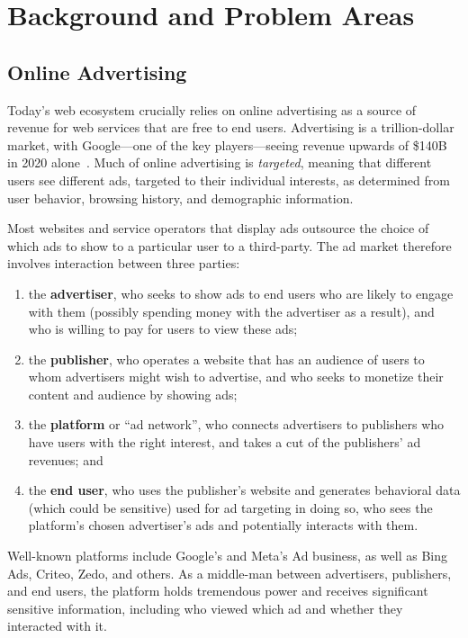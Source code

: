 \section{Background and Problem Areas}
\label{s:bg}

\subsection{Online Advertising}

Today's web ecosystem crucially relies on online advertising as a source of
revenue for web services that are free to end users.
%
Advertising is a trillion-dollar market, with Google---one of the key
players---seeing revenue upwards of \$140B in 2020 alone~\cite{xxx}.
%
Much of online advertising is \emph{targeted}, meaning that different users
see different ads, targeted to their individual interests, as determined
from user behavior, browsing history, and demographic information.
%

%
Most websites and service operators that display ads outsource the choice of
which ads to show to a particular user to a third-party.
%
The ad market therefore involves interaction between three parties:
\begin{enumerate}
 \item the \textbf{advertiser}, who seeks to show ads to end users who
   are likely to engage with them (possibly spending money with the
   advertiser as a result), and who is willing to pay for users to view
   these ads;
 \item the \textbf{publisher}, who operates a website that has an audience
   of users to whom advertisers might wish to advertise, and who seeks
   to monetize their content and audience by showing ads;
 \item the \textbf{platform} or ``ad network'', who connects advertisers
   to publishers who have users with the right interest, and takes a cut
   of the publishers' ad revenues; and
 \item the \textbf{end user}, who uses the publisher's website and generates
   behavioral data (which could be sensitive) used for ad targeting in doing so,
   who sees the platform's chosen advertiser's ads and potentially interacts
   with them.
\end{enumerate}
%
Well-known platforms include Google's and Meta's Ad business, as well
as Bing Ads, Criteo, Zedo, and others.
%
As a middle-man between advertisers, publishers, and end users, the platform
holds tremendous power and receives significant sensitive information, including
who viewed which ad and whether they interacted with it.
%

